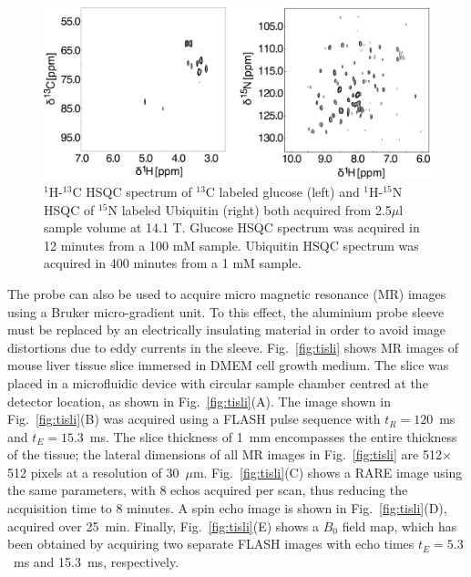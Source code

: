 \documentclass[preprint,5p]{elsarticle}
\newcommand{\fig}[1]{Fig.~\ref{#1}}
\begin{document}
\begin{figure} \centering
\includegraphics[width=\linewidth,keepaspectratio=true]{./figures/ms5n17-tlp-sp-180612-HSQCspect.png}
\caption{ $^1$H-$^{13}$C HSQC spectrum of $^{13}$C labeled glucose (left) and
$^1$H-$^{15}$N HSQC of $^{15}$N labeled Ubiquitin (right) both acquired from
2.5$\mu$l sample volume at 14.1 T. Glucose HSQC spectrum was acquired in 12
minutes from a 100 mM sample. Ubiquitin HSQC spectrum was acquired in 400
minutes from a 1 mM sample.} \label{fig:HSQC} \end{figure}
The probe can also be used to acquire micro magnetic resonance (MR) images using
a Bruker micro-gradient unit. To this effect, the aluminium probe sleeve must be
replaced by an electrically insulating material in order to avoid image
distortions due to eddy currents in the sleeve. \fig{fig:tisli} shows MR images
of mouse liver tissue slice immersed in DMEM cell growth medium. The slice was
placed in a microfluidic device with circular sample chamber centred at the
detector location, as shown in \fig{fig:tisli}(A). The image shown in
\fig{fig:tisli}(B) was acquired using a FLASH pulse sequence with $t_R=120$~ms
and $t_E=15.3$~ms. The slice thickness of  1~mm encompasses the entire thickness
of the tissue; the lateral dimensions of all MR images in \fig{fig:tisli} are
512$\times$512 pixels at a resolution of 30~$\mu$m. \fig{fig:tisli}(C) shows a
RARE image using the same parameters, with 8 echos acquired per scan, thus
reducing the acquisition time to 8 minutes. A spin echo image is shown in
\fig{fig:tisli}(D), acquired over 25~min. Finally, \fig{fig:tisli}(E) shows a
$B_0$ field map, which has been obtained by acquiring two separate FLASH images
with echo times $t_E=5.3$~ms and 15.3~ms, respectively.
\end{document}
